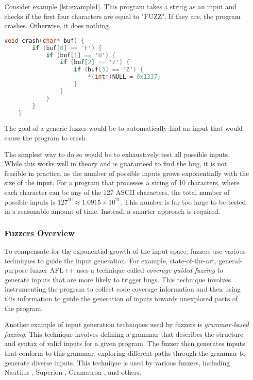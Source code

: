 Consider example \ref{lst:example1}. This program takes a string as an input and checks if the first four characters are equal to "FUZZ". If they are, the program crashes. Otherwise, it does nothing.

\begin{lstlisting}[caption={Fuzzing example}, label={lst:example1}, language=C, xleftmargin=2em, breaklines=true, captionpos=b]
    void crash(char* buf) {
        if (buf[0] == 'F') {
            if (buf[1] == 'U') {
                if (buf[2] == 'Z') {
                    if (buf[3] == 'Z') {
                        *(int*)NULL = 0x1337;
                    }
                }
            }
        }
    }
\end{lstlisting}

The goal of a generic fuzzer would be to automatically find an input that would cause the program to crash.

The simplest way to do so would be to exhaustively test all possible inputs. While this works well in theory and is guaranteed to find the bug, it is not feasible in practice, as the number of possible inputs grows exponentially with the size of the input. For a program that processes a string of 10 characters, where each character can be any of the 127 ASCII characters, the total number of possible inputs is $127^{10} \approx 1.0915 \times 10^{21}$. This number is far too large to be tested in a reasonable amount of time. Instead, a smarter approach is required.

\subsubsection{Fuzzers Overview}

To compensate for the exponential growth of the input space, fuzzers use various techniques to guide the input generation. For example, state-of-the-art, general-purpose fuzzer AFL++ \cite{AFLplusplus-Woot20} uses a technique called \textit{coverage-guided fuzzing} to generate inputs that are more likely to trigger bugs. This technique involves instrumenting the program to collect code coverage information and then using this information to guide the generation of inputs towards unexplored parts of the program.

Another example of input generation techniques used by fuzzers is \textit{grammar-based fuzzing}. This technique involves defining a grammar that describes the structure and syntax of valid inputs for a given program. The fuzzer then generates inputs that conform to this grammar, exploring different paths through the grammar to generate diverse inputs. This technique is used by various fuzzers, including Nautilus \cite{nautilus-grammar-fuzzer}, Superion \cite{superion-grammar-fuzzer}, Gramatron \cite{gramatron-effective-grammar-aware-fuzzing}, and others.

